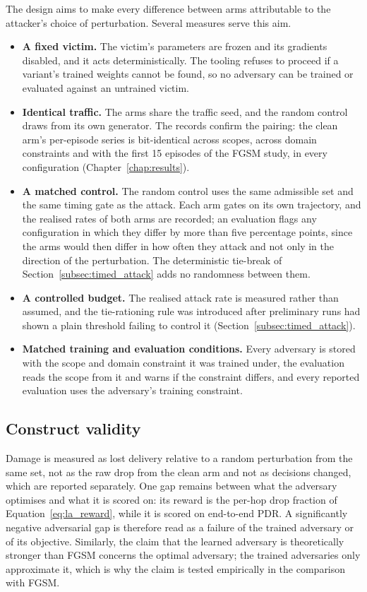 The design aims to make every difference between arms attributable to the attacker's
choice of perturbation. Several measures serve this aim.
\begin{itemize}
  \item \textbf{A fixed victim.} The victim's parameters are frozen and its gradients
        disabled, and it acts deterministically. The tooling refuses to proceed if a
        variant's trained weights cannot be found, so no adversary can be trained or
        evaluated against an untrained victim.
  \item \textbf{Identical traffic.} The arms share the traffic seed, and the random
        control draws from its own generator. The records confirm the pairing: the
        clean arm's per-episode series is bit-identical across scopes, across domain
        constraints and with the first 15 episodes of the FGSM study, in every
        configuration (Chapter~\ref{chap:results}).
  \item \textbf{A matched control.} The random control uses the same admissible set and
        the same timing gate as the attack. Each arm gates on its own trajectory, and
        the realised rates of both arms are recorded; an evaluation flags any
        configuration in which they differ by more than five percentage points, since
        the arms would then differ in how often they attack and not only in the
        direction of the perturbation. The deterministic tie-break of
        Section~\ref{subsec:timed_attack} adds no randomness between them.
  \item \textbf{A controlled budget.} The realised attack rate is measured rather than
        assumed, and the tie-rationing rule was introduced after preliminary runs had
        shown a plain threshold failing to control it
        (Section~\ref{subsec:timed_attack}).
  \item \textbf{Matched training and evaluation conditions.} Every adversary is stored
        with the scope and domain constraint it was trained under, the evaluation reads
        the scope from it and warns if the constraint differs, and every reported
        evaluation uses the adversary's training constraint.
\end{itemize}

\subsection{Construct validity}
\label{subsec:validity_construct}

Damage is measured as lost delivery relative to a random perturbation from the same set,
not as the raw drop from the clean arm and not as decisions changed, which are reported
separately. One gap remains between what the adversary optimises and what it is scored
on: its reward is the per-hop drop fraction of Equation~\eqref{eq:la_reward}, while it
is scored on end-to-end PDR. A significantly negative adversarial gap is therefore read
as a failure of the trained adversary or of its objective. Similarly, the claim that the
learned adversary is theoretically stronger than FGSM concerns the optimal adversary;
the trained adversaries only approximate it,
which is why the claim is tested empirically in the comparison with FGSM.

